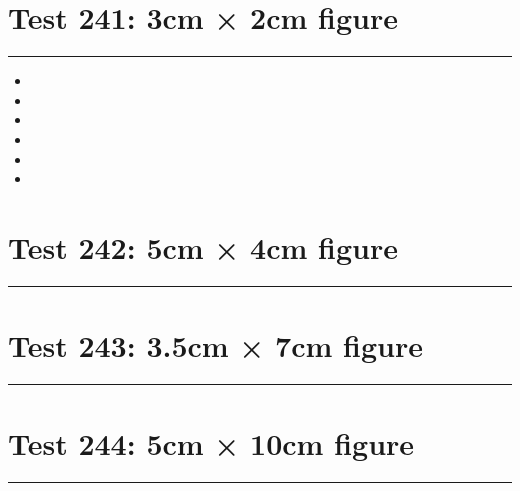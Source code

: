 \documentclass[a4paper,11pt]{article}
\begin{document}
\section*{Test 241: 3cm × 2cm figure}
\begin{swarmwrap}%
  \begin{minipage}[t]{3cm}
    \centering
    \rule{\linewidth}{2cm}
  \end{minipage}%
\end{swarmwrap}%
\swarmwrapnext
\lipsum[77]
\begin{itemize}
  \item \lipsum[78][1-3]
  \item \lipsum[79][1-3]
  \item \lipsum[80][1-3]
  \item \lipsum[81][1-3]
  \item \lipsum[82][1-3]
  \item \lipsum[83][1-3]
\end{itemize}
\section*{Test 242: 5cm × 4cm figure}
\begin{swarmwrap}%
  \begin{minipage}[t]{5cm}
    \centering
    \rule{\linewidth}{4cm}
  \end{minipage}%
\end{swarmwrap}%
\swarmwrapnext
\lipsum[139]
\lipsum[140]
\lipsum[141]
\lipsum[142]
\lipsum[143]
\lipsum[144]
\section*{Test 243: 3.5cm × 7cm figure}
\begin{swarmwrap}%
  \begin{minipage}[t]{3cm}
    \centering
    \rule{\linewidth}{7cm}
  \end{minipage}%
\end{swarmwrap}%
\swarmwrapnext
\lipsum[143]
\lipsum[144]
\lipsum[145]
\lipsum[146]
\lipsum[147]
\section*{Test 244: 5cm × 10cm figure}
\begin{swarmwrap}%
  \begin{minipage}[t]{5cm}
    \centering
    \rule{\linewidth}{10cm}
  \end{minipage}%
\end{swarmwrap}%
\swarmwrapnext
\lipsum[118]
\lipsum[119]
\lipsum[120]
\lipsum[121]
\lipsum[122]
\lipsum[123]
\end{document}

